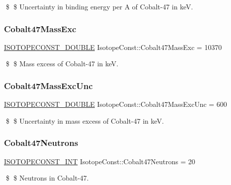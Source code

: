 \$ \$ Uncertainty in binding energy per A of Cobalt-\/47 in keV. \mbox{\label{group___isotope_const-_cobalt-_co47_ga5d0db8d1c4f59e484e0afa3cfc67a5db}} 
\subsubsection{\texorpdfstring{Cobalt47\+Mass\+Exc}{Cobalt47MassExc}}
{\footnotesize\ttfamily \mbox{\hyperlink{group___isotope_const-_macros_ga8f45a7272ce02c0b4c65c44636ed719a}{I\+S\+O\+T\+O\+P\+E\+C\+O\+N\+S\+T\+\_\+\+D\+O\+U\+B\+LE}} Isotope\+Const\+::\+Cobalt47\+Mass\+Exc = 10370}

\$ \$ Mass excess of Cobalt-\/47 in keV. \mbox{\label{group___isotope_const-_cobalt-_co47_gac3c07a624f4956b152e29c4f613d4f7d}} 
\subsubsection{\texorpdfstring{Cobalt47\+Mass\+Exc\+Unc}{Cobalt47MassExcUnc}}
{\footnotesize\ttfamily \mbox{\hyperlink{group___isotope_const-_macros_ga8f45a7272ce02c0b4c65c44636ed719a}{I\+S\+O\+T\+O\+P\+E\+C\+O\+N\+S\+T\+\_\+\+D\+O\+U\+B\+LE}} Isotope\+Const\+::\+Cobalt47\+Mass\+Exc\+Unc = 600}

\$ \$ Uncertainty in mass excess of Cobalt-\/47 in keV. \mbox{\label{group___isotope_const-_cobalt-_co47_gabe5a80fa1a292359e2497542a5131662}} 
\subsubsection{\texorpdfstring{Cobalt47\+Neutrons}{Cobalt47Neutrons}}
{\footnotesize\ttfamily \mbox{\hyperlink{group___isotope_const-_macros_ga5f18360b3e99483a35c32d789e62621c}{I\+S\+O\+T\+O\+P\+E\+C\+O\+N\+S\+T\+\_\+\+I\+NT}} Isotope\+Const\+::\+Cobalt47\+Neutrons = 20}

\$ \$ Neutrons in Cobalt-\/47. \mbox{\label{group___isotope_const-_cobalt-_co47_gae44eb3ae1e4d620cf5007c723a5c1a70}} 
